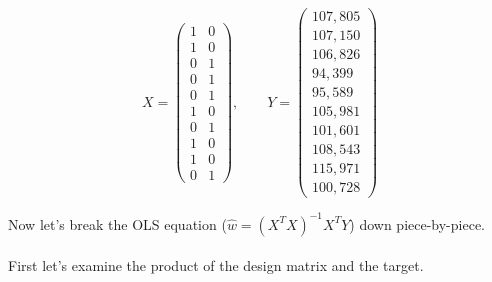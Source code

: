 \[
X = \left(\begin{array}{cc}
          1  &  0 \\ 
          1  &  0 \\ 
          0  &  1 \\ 
          0  &  1 \\ 
          0  &  1 \\ 
          1  &  0 \\ 
          0  &  1 \\ 
          1  &  0 \\ 
          1  &  0 \\ 
          0  &  1
\end{array}\right)
,
\quad\quad
Y = \left(\begin{array}{c}
         107,805 \\ 
         107,150 \\ 
         106,826 \\ 
          94,399 \\ 
          95,589 \\ 
         105,981 \\ 
         101,601 \\ 
         108,543 \\ 
         115,971 \\ 
         100,728 
\end{array}\right)
\] 

Now let's break the OLS equation ($\hat{w} = (X^T X)^{-1} X^T Y $) down
piece-by-piece. \\
\\
First let's examine the product of the design matrix and the target.

